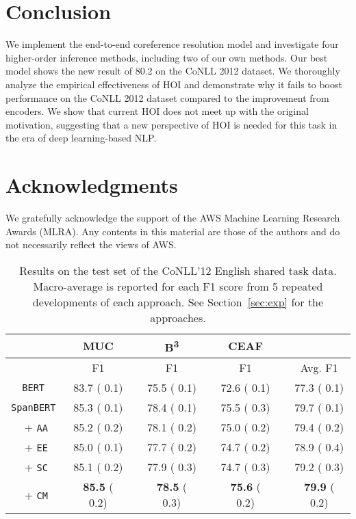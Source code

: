 \documentclass[11pt,a4paper]{article}
\newcommand\AAA{\texttt{AA}}  \newcommand\EE{\texttt{EE}}
\newcommand\SC{\texttt{SC}}
\newcommand\CM{\texttt{CM}}
\begin{document}
 \section{Conclusion}
\label{sec:conclusion}

We implement the end-to-end coreference resolution model and investigate four higher-order inference methods, including two of our own methods. 
Our best model shows the new result of 80.2 on the CoNLL 2012 dataset. 
We thoroughly analyze the empirical effectiveness of HOI and demonstrate why it fails to boost performance on the CoNLL 2012 dataset compared to the improvement from encoders. We show that current HOI does not meet up with the original motivation, suggesting that a new perspective of HOI is needed for this task in the era of deep learning-based NLP. \section*{Acknowledgments}

We gratefully acknowledge the support of the AWS Machine Learning Research Awards (MLRA).
Any contents in this material are those of the authors and do not necessarily reflect the views of AWS. 



\cleardoublepage\appendix
\begin{table*}[hb]
\small
\centering
\begin{tabular}{>{\quad}cccccccc}
\toprule
 & \multicolumn{1}{c}{MUC} & & \multicolumn{1}{c}{B\textsuperscript{3}} & & \multicolumn{1}{c}{CEAF\textsubscript{}}\\
 \cmidrule{2-2} \cmidrule{4-4} \cmidrule{6-6}  
 & F1 & & F1 & & F1 & & Avg. F1\\
\midrule
\tt BERT & 83.7 ( 0.1) & & 75.5 ( 0.1) & & 72.6 ( 0.1) && 77.3 ( 0.1) \\
\tt SpanBERT & 85.3 ( 0.1) & & 78.4 ( 0.1) & & 75.5 ( 0.3) && 79.7 ( 0.1) \\
+ \AAA & 85.2 ( 0.2) & & 78.1 ( 0.2) & & 75.0 ( 0.2) && 79.4 ( 0.2) \\
+ \EE & 85.0 ( 0.1) & & 77.7 ( 0.2) & & 74.7 ( 0.2) && 78.9 ( 0.4) \\
+ \SC & 85.1 ( 0.2) & & 77.9 ( 0.3) & & 74.7 ( 0.3) && 79.2 ( 0.3) \\
+ \CM & \textbf{85.5} ( 0.2) & & \textbf{78.5} ( 0.3) & & \textbf{75.6} ( 0.2) && \textbf{79.9} ( 0.2) \\
\bottomrule
\end{tabular}
\caption{Results on the test set of the CoNLL'12 English shared task data. Macro-average is reported for each F1 score from 5 repeated developments of each approach. See Section~\ref{sec:exp} for the approaches.}
\label{table:results_avg}
\end{table*} 
\end{document}
